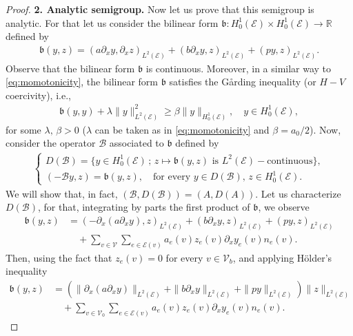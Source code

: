 \documentclass[a4paper, 10pt, english]{article}
\def\R{\mathbb R}
\def\to{\rightarrow}
\begin{document}
\begin{proof}
\smallskip
\noindent
\textbf{2. Analytic semigroup.}
Now let us prove that this semigroup is analytic. For that let us consider the bilinear form $\mathfrak{b}:H_0^1(\mathcal{E})\times H_0^1(\mathcal{E})\to \R$ defined by     \begin{align}\label{eq:bilinear_form_b}
    \mathfrak{b}(y,z)= (a\partial_x y,\partial_xz )_{L^2(\mathcal{E})} +(b\partial_x y,z)_{L^2(\mathcal{E})} + (py,z)_{L^2(\mathcal{E})}.
\end{align}
Observe that the bilinear form $\mathfrak{b}$ is continuous. Moreover, in a similar way to \eqref{eq:momotonicity}, the bilinear form $\mathfrak{b}$ satisfies the Gårding inequality (or $H-V$ coercivity), i.e.,
\begin{align}\label{eq:VHcoercitivity}
\mathfrak{b}(y,y) +\lambda\| y\|^2_{L^2(\mathcal{E})} \geq \beta\|y \|_{H_0^1(\mathcal{E})},\quad y\in H^1_0(\mathcal{E}),
\end{align}
for some $\lambda,\,\beta>0$ ($\lambda$ can be taken as in \eqref{eq:momotonicity} and $\beta =a_0/2$). Now, consider the operator $\mathfrak{\mathcal{B}}$ associated to $\mathfrak{b}$
 defined by 
 \begin{align*}
     \begin{cases}
         D(\mathfrak{\mathcal{B}}) = \{y\in H_0^1(\mathcal{E})\,;\, z\mapsto \mathfrak{b}(y,z) \text{ is } L^2(\mathcal{E}) -\text{continuous}\},\\
         (-\mathfrak{\mathcal{B}}y,z)=\mathfrak{b}(y,z),\quad \text{for every }y\in D(\mathfrak{\mathcal{B}}),\, z\in H_0^1(\mathcal{E}). 
     \end{cases}
 \end{align*}
We will show that, in fact, $(\mathfrak{\mathcal{B}},D(\mathfrak{\mathcal{B}})) =(A,D(A))$. Let us characterize $D(\mathfrak{\mathcal{B}})$, for that, integrating by parts the first product of $\mathfrak{b}$, we observe
\begin{align}\label{eq:first_integration_bilinear}
   \nonumber \mathfrak{b}(y,z) &= (-\partial_x (a\partial_x y),z)_{L^2(\mathcal{E})}+(b\partial_x y,z)_{L^2(\mathcal{E})} +(p y,z)_{L^2(\mathcal{E})}\\ &\quad+\sum_{v\in\mathcal{V}}\sum_{e\in\mathcal{E}(v)}a_e(v)z_e(v)\partial_x y_e(v)n_e(v). 
\end{align}
Then, using the fact that $z_e(v)=0$ for every $v\in\mathcal{V}_b$, and applying H\"older's inequality 
\begin{align*}
    \mathfrak{b}(y,z) &= \left(\|\partial_x (a\partial_x y)\|_{L^2(\mathcal{E})}+\|b\partial_x y\|_{L^2(\mathcal{E})} +\|p y\|_{L^2(\mathcal{E})}\right)\|z\|_{L^2(\mathcal{E})}\\ &\quad+\sum_{v\in\mathcal{V}_0}\sum_{e\in\mathcal{E}(v)}a_e(v)z_e(v)\partial_x y_e(v)n_e(v). 

\end{align*}
\end{proof}
\end{document}
